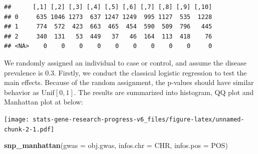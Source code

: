\documentclass[
]{article}
\newenvironment{Shaded}{\begin{snugshade}}{\end{snugshade}}
\newcommand{\CommentTok}[1]{\textcolor[rgb]{0.56,0.35,0.01}{\textit{#1}}}
\newcommand{\DataTypeTok}[1]{\textcolor[rgb]{0.13,0.29,0.53}{#1}}
\newcommand{\DecValTok}[1]{\textcolor[rgb]{0.00,0.00,0.81}{#1}}
\newcommand{\FloatTok}[1]{\textcolor[rgb]{0.00,0.00,0.81}{#1}}
\newcommand{\KeywordTok}[1]{\textcolor[rgb]{0.13,0.29,0.53}{\textbf{#1}}}
\newcommand{\NormalTok}[1]{#1}
\newcommand{\OperatorTok}[1]{\textcolor[rgb]{0.81,0.36,0.00}{\textbf{#1}}}
\newcommand{\StringTok}[1]{\textcolor[rgb]{0.31,0.60,0.02}{#1}}
\begin{document}
\begin{verbatim}
##      [,1] [,2] [,3] [,4] [,5] [,6] [,7] [,8] [,9] [,10]
## 0     635 1046 1273  637 1247 1249  995 1127  535  1228
## 1     774  572  423  663  465  454  590  509  796   445
## 2     340  131   53  449   37   46  164  113  418    76
## <NA>    0    0    0    0    0    0    0    0    0     0
\end{verbatim}

We randomly assigned an individual to case or control, and assume the
disease prevalence is 0.3. Firstly, we conduct the classical logistic
regression to test the main effects. Because of the random assignment,
the p-values should have similar behavior as \(\text{Unif}[0,1]\). The
results are summarized into histogram, QQ plot and Manhattan plot at
below:

\begin{Shaded}
\end{Shaded}

\texttt{[image: stats-gene-research-progress-v6\_files/figure-latex/unnamed-chunk-2-1.pdf]}

\begin{Shaded}
\begin{Highlighting}[]
\KeywordTok{snp_manhattan}\NormalTok{(}\DataTypeTok{gwas =}\NormalTok{ obj.gwas, }\DataTypeTok{infos.chr =}\NormalTok{ CHR, }\DataTypeTok{infos.pos =}\NormalTok{ POS)}
\end{Highlighting}
\end{Shaded}
\end{document}
